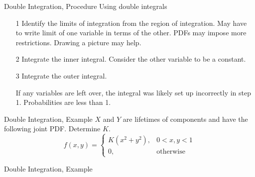 \documentclass[t,handout]{beamer}
\begin{document}
\begin{frame}{Double Integration, Procedure}
    Using double integrals
    \begin{itemize}
        \item[1] Identify the limits of integration from the region of integration. May have to write limit of one variable in terms of the other. PDFs may impose more restrictions. Drawing a picture may help.
        \item[2] Integrate the inner integral. Consider the other variable to be a constant.
        \item[3] Integrate the outer integral.
        \item[\checkmark\checkmark] If any variables are left over, the integral was likely set up incorrectly in step 1. Probabilities are less than 1.
    \end{itemize}
\end{frame}
\begin{frame}{Double Integration, Example}
    $X$ and $Y$ are lifetimes of components and have the following joint PDF. Determine $K$.
    $$
        f(x,y)=
        \begin{cases}
            K(x^2 + y^2), & 0<x,y<1          \\
            0,            & \text{otherwise}
        \end{cases}
    $$
\end{frame}
\begin{frame}{Double Integration, Example}
\end{frame}
\end{document}
